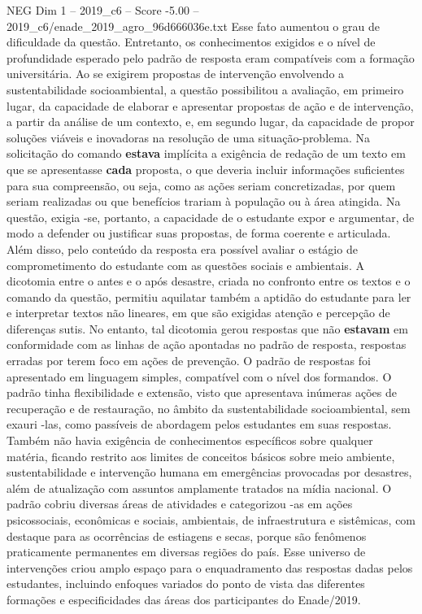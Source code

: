 \begin{textsample}{NEG Dim 1 – 2019\_c6 – Score -5.00 – 2019\_c6/enade\_2019\_agro\_96d666036e.txt}
Esse fato aumentou o grau de dificuldade da questão.
Entretanto, os conhecimentos exigidos e o nível de profundidade esperado pelo padrão de resposta eram compatíveis com a formação universitária.
Ao se exigirem propostas de intervenção envolvendo a sustentabilidade socioambiental, a questão possibilitou a avaliação, em primeiro lugar, da capacidade de elaborar e apresentar propostas de ação e de intervenção, a partir da análise de um contexto, e, em segundo lugar, da capacidade de propor soluções viáveis e inovadoras na resolução de uma situação-problema.
Na solicitação do comando \textbf{estava} implícita a exigência de redação de um texto em que se apresentasse \textbf{cada} proposta, o que deveria incluir informações suficientes para sua compreensão, ou seja, como as ações seriam concretizadas, por quem seriam realizadas ou que benefícios trariam à população ou à área atingida.
Na questão, exigia -se, portanto, a capacidade de o estudante expor e argumentar, de modo a defender ou justificar suas propostas, de forma coerente e articulada.
Além disso, pelo conteúdo da resposta era possível avaliar o estágio de comprometimento do estudante com as questões sociais e ambientais.
A dicotomia entre o antes e o após desastre, criada no confronto entre os textos e o comando da questão, permitiu aquilatar também a aptidão do estudante para ler e interpretar textos não lineares, em que são exigidas atenção e percepção de diferenças sutis.
No entanto, tal dicotomia gerou respostas que não \textbf{estavam} em conformidade com as linhas de ação apontadas no padrão de resposta, respostas erradas por terem foco em ações de prevenção.
O padrão de respostas foi apresentado em linguagem simples, compatível com o nível dos formandos.
O padrão tinha flexibilidade e extensão, visto que apresentava inúmeras ações de recuperação e de restauração, no âmbito da sustentabilidade socioambiental, sem exauri -las, como passíveis de abordagem pelos estudantes em suas respostas.
Também não havia exigência de conhecimentos específicos sobre qualquer matéria, ficando restrito aos limites de conceitos básicos sobre meio ambiente, sustentabilidade e intervenção humana em emergências provocadas por desastres, além de atualização com assuntos amplamente tratados na mídia nacional.
O padrão cobriu diversas áreas de atividades e categorizou -as em ações psicossociais, econômicas e sociais, ambientais, de infraestrutura e sistêmicas, com destaque para as ocorrências de estiagens e secas, porque são fenômenos praticamente permanentes em diversas regiões do país.
Esse universo de intervenções criou amplo espaço para o enquadramento das respostas dadas pelos estudantes, incluindo enfoques variados do ponto de vista das diferentes formações e especificidades das áreas dos participantes do Enade/2019.

\end{textsample}
